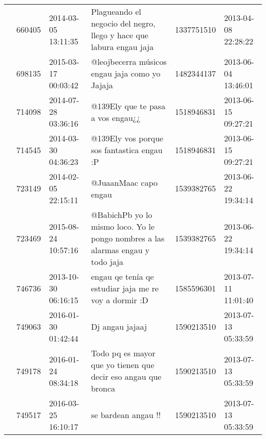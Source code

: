\begin{tabular}{llllrl}
           & 660405  & 2014-03-05 13:11:35 &                                                                          Plagueando el negocio del negro, llego y hace que labura engau jaja &  1337751510 & 2013-04-08 22:28:22 \\
           & 698135  & 2015-03-17 00:03:42 &                                                                                               @leojbecerra músicos engau jaja como yo Jajaja &  1482344137 & 2013-06-04 13:46:01 \\
           & 714098  & 2014-07-28 03:36:16 &                                                                                                            @139Ely que te pasa a vos engau¿¿ &  1518946831 & 2013-06-15 09:27:21 \\
           & 714545  & 2014-03-30 04:36:23 &                                                                                                   @139Ely vos porque sos fantastica engau :P &  1518946831 & 2013-06-15 09:27:21 \\
           & 723149  & 2014-02-05 22:15:11 &                                                                                                                        @JuaanMaac capo engau &  1539382765 & 2013-06-22 19:34:14 \\
           & 723469  & 2015-08-24 10:57:16 &                                                              @BabichPb yo lo mismo loco. Yo le pongo nombres a las alarmas engau y todo jaja &  1539382765 & 2013-06-22 19:34:14 \\
           & 746736  & 2013-10-30 06:16:15 &                                                                                        engau qe tenía qe estudiar jaja me re voy a dormir :D &  1585596301 & 2013-07-11 11:01:40 \\
           & 749063  & 2016-01-30 01:42:44 &                                                                                                                              Dj angau jajaaj &  1590213510 & 2013-07-13 05:33:59 \\
           & 749178  & 2016-01-24 08:34:18 &                                                                               Todo pq es mayor que yo  tienen que decir eso angau que bronca &  1590213510 & 2013-07-13 05:33:59 \\
           & 749517  & 2016-03-25 16:10:17 &                                                                                                                          se bardean angau !! &  1590213510 & 2013-07-13 05:33:59 \\

\end{tabular}
